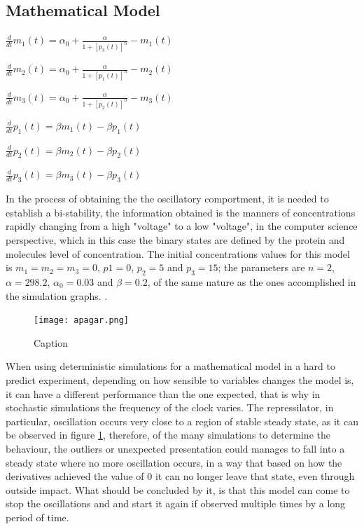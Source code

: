 \documentclass[12pt]{article}
\begin{document}
\subsection{Mathematical Model}



$\frac{d}{dt}m_{1}(t) = \alpha_{0} + \frac{\alpha}{1 + [p_{3}(t)]^{n}} - m_{1}(t)$

$\frac{d}{dt}m_{2}(t) = \alpha_{0} + \frac{\alpha}{1 + [p_{1}(t)]^{n}} - m_{2}(t)$

$\frac{d}{dt}m_{3}(t) = \alpha_{0} + \frac{\alpha}{1 + [p_{2}(t)]^{n}} - m_{3}(t)$

$\frac{d}{dt}p_{1}(t) = \beta{m_{1}}(t) - \beta{p_{1}}(t)$

$\frac{d}{dt}p_{2}(t) = \beta{m_{2}}(t) - \beta{p_{2}}(t)$

$\frac{d}{dt}p_{3}(t) = \beta{m_{3}}(t) - \beta{p_{3}}(t)$ 

In the process of obtaining the the oscillatory comportment, it is needed to establish a bi-stability, the information obtained is the manners of concentrations rapidly changing from a high "voltage" to a low "voltage", in the computer science perspective, which in this case the binary states are defined by the protein and molecules level of concentration. The initial concentrations values for this model is $m_{1} = m_{2} = m_{3} = 0$, $p1 = 0$, $p_{2} = 5$ and $p_{3} = 15$; the parameters are $n = 2$, $\alpha = 298.2$, $\alpha_{0} = 0.03$ and $\beta = 0.2$, of the same nature as the ones accomplished in the simulation graphs. \cite{ingalls2013mathematical}.

\begin{figure}[h]
    \centering
    \texttt{[image: apagar.png]}
    \caption{Caption}
    \label{fig:phase_plane_repressilator}
\end{figure}

When using deterministic simulations for a mathematical model in a hard to predict experiment, depending on how sensible to variables changes the model is, it can have a different performance than the one expected, that is why in stochastic simulations the frequency of the clock varies. The repressilator, in particular, oscillation occurs very close to a region of stable steady state, as it can be observed in figure \ref{fig:phase_plane_repressilator}, therefore, of the many simulations to determine the behaviour, the outliers or unexpected presentation could manages to fall into a steady state where no more oscillation occurs, in a way that based on how the derivatives achieved the value of 0 it can no longer leave that state, even through outside impact. What should be concluded by it, is that this model can come to stop the oscillations and and start it again if observed multiple times by a long period of time.
\end{document}
